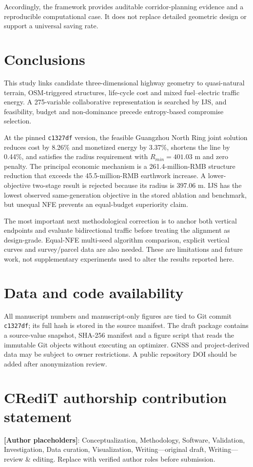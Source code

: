 \documentclass[preprint,12pt]{elsarticle}
\begin{document}
Accordingly, the framework provides auditable corridor-planning evidence and a reproducible computational case. It does not replace detailed geometric design or support a universal saving rate.

\section{Conclusions}

This study links candidate three-dimensional highway geometry to quasi-natural terrain, OSM-triggered structures, life-cycle cost and mixed fuel--electric traffic energy. A 275-variable collaborative representation is searched by IJS, and feasibility, budget and non-dominance precede entropy-based compromise selection.

At the pinned \texttt{c1327df} version, the feasible Guangzhou North Ring joint solution reduces cost by 8.26\% and monetized energy by 3.37\%, shortens the line by 0.44\%, and satisfies the radius requirement with $R_{min}=401.03$ m and zero penalty. The principal economic mechanism is a 261.4-million-RMB structure reduction that exceeds the 45.5-million-RMB earthwork increase. A lower-objective two-stage result is rejected because its radius is 397.06 m. IJS has the lowest observed same-generation objective in the stored ablation and benchmark, but unequal NFE prevents an equal-budget superiority claim.

The most important next methodological correction is to anchor both vertical endpoints and evaluate bidirectional traffic before treating the alignment as design-grade. Equal-NFE multi-seed algorithm comparison, explicit vertical curves and survey/parcel data are also needed. These are limitations and future work, not supplementary experiments used to alter the results reported here.

\section*{Data and code availability}
All manuscript numbers and manuscript-only figures are tied to Git commit \texttt{c1327df}; its full hash is stored in the source manifest. The draft package contains a source-value snapshot, SHA-256 manifest and a figure script that reads the immutable Git objects without executing an optimizer. GNSS and project-derived data may be subject to owner restrictions. A public repository DOI should be added after anonymization review.

\section*{CRediT authorship contribution statement}
\textbf{[Author placeholders]}: Conceptualization, Methodology, Software, Validation, Investigation, Data curation, Visualization, Writing---original draft, Writing---review \& editing. Replace with verified author roles before submission.
\end{document}
